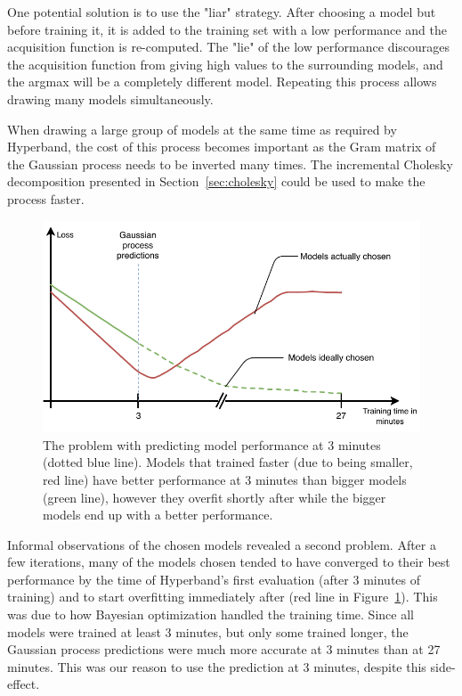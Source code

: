 One potential solution is to use the "liar" strategy. After choosing a model but before training it, it is added to the training set with a low performance and the acquisition function is re-computed. The "lie" of the low performance discourages the acquisition function from giving high values to the surrounding models, and the argmax will be a completely different model. Repeating this process allows drawing many models simultaneously. 

When drawing a large group of models at the same time as required by Hyperband, the cost of this process becomes important as the Gram matrix of the Gaussian process needs to be inverted many times. The incremental Cholesky decomposition presented in Section~\ref{sec:cholesky} could be used to make the process faster.

\begin{figure}[htbp]
	\centering
	\includegraphics[width=\linewidth]{img_hyperopt/combine_overfit}
	\caption[Why predicting model performance at 3 minutes lead to overfitting]{The problem with predicting model performance at 3 minutes (dotted blue line). Models that trained faster (due to being smaller, red line) have better performance at 3 minutes than bigger models (green line), however they overfit shortly after while the bigger models end up with a better performance.}
	\label{fig:combine_overfit}
\end{figure}

Informal observations of the chosen models revealed a second problem. After a few iterations, many of the models chosen tended to have converged to their best performance by the time of Hyperband's first evaluation (after 3 minutes of training) and to start overfitting immediately after (red line in Figure~\ref{fig:combine_overfit}). This was due to how Bayesian optimization handled the training time. Since all models were trained at least 3 minutes, but only some trained longer, the Gaussian process predictions were much more accurate at 3 minutes than at 27 minutes. This was our reason to use the prediction at 3 minutes, despite this side-effect.

